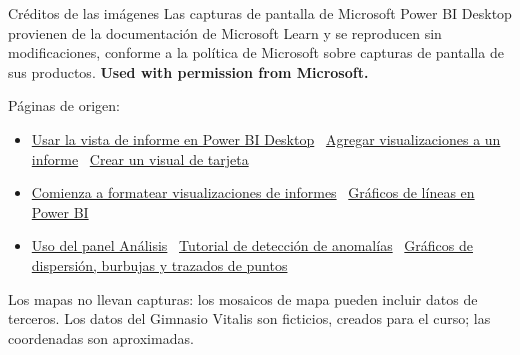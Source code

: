 \documentclass[aspectratio=169,11pt]{beamer}
\newcommand{\urlinforme}{https://learn.microsoft.com/es-es/power-bi/create-reports/desktop-report-view}
\newcommand{\urlagregar}{https://learn.microsoft.com/es-es/power-bi/visuals/power-bi-report-add-visualizations-i}
\newcommand{\urltarjeta}{https://learn.microsoft.com/es-es/power-bi/visuals/power-bi-visualization-card}
\newcommand{\urlformato}{https://learn.microsoft.com/es-es/power-bi/visuals/service-getting-started-with-color-formatting-and-axis-properties}
\newcommand{\urllineas}{https://learn.microsoft.com/es-es/power-bi/visuals/power-bi-line-chart}
\newcommand{\urlanalisis}{https://learn.microsoft.com/es-es/power-bi/transform-model/desktop-analytics-pane}
\newcommand{\urlanomalias}{https://learn.microsoft.com/es-es/power-bi/visuals/power-bi-visualization-anomaly-detection}
\newcommand{\urldispersion}{https://learn.microsoft.com/es-es/power-bi/visuals/power-bi-visualization-scatter}
\begin{document}
\begin{frame}[t]{Créditos de las imágenes}
  \scriptsize
  Las capturas de pantalla de Microsoft Power BI Desktop provienen de la
  documentación de Microsoft Learn y se reproducen sin modificaciones,
  conforme a la política de Microsoft sobre capturas de pantalla de sus
  productos. \textbf{Used with permission from Microsoft.}
  \vspace{0.15cm}

  Páginas de origen:
  \begin{itemize}
    \scriptsize
    \item \href{\urlinforme}{Usar la vista de informe en Power BI Desktop}
      \textperiodcentered\ \href{\urlagregar}{Agregar visualizaciones a un informe}
      \textperiodcentered\ \href{\urltarjeta}{Crear un visual de tarjeta}
    \item \href{\urlformato}{Comienza a formatear visualizaciones de informes}
      \textperiodcentered\ \href{\urllineas}{Gráficos de líneas en Power BI}
    \item \href{\urlanalisis}{Uso del panel Análisis}
      \textperiodcentered\ \href{\urlanomalias}{Tutorial de detección de anomalías}
      \textperiodcentered\ \href{\urldispersion}{Gráficos de dispersión, burbujas y trazados de puntos}
  \end{itemize}
  \vspace{0.1cm}
  Los mapas no llevan capturas: los mosaicos de mapa pueden incluir datos
  de terceros. Los datos del Gimnasio Vitalis son ficticios, creados para
  el curso; las coordenadas son aproximadas.
\end{frame}

{
\begin{frame}
\end{frame}
}
\end{document}
